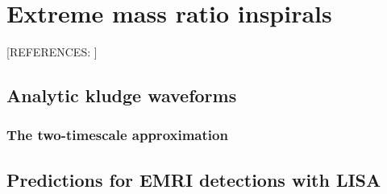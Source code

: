 \chapter{Extreme mass ratio inspirals}

 [REFERENCES: \cite{PhysRevD.96.044005}]

\section{Analytic kludge waveforms}

\subsection{The two-timescale approximation}

\section{Predictions for EMRI detections with LISA}